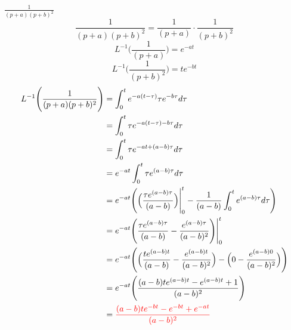 \item[4.]$\frac{1}{(p+a)(p+b)^2}$
\[
    \frac{1}{(p+a)(p+b)^2} = \frac{1}{(p+a)}\cdot\frac{1}{(p+b)^2}
\]
\begin{equation*}
    L^{-1}\Bigg(\frac{1}{(p+a)}\Bigg) 
    = e^{-at}
    \tag{By \( L2 \)}
\end{equation*}
\begin{equation*}
    L^{-1}\Bigg(\frac{1}{(p+b)^2}\Bigg) 
    = te^{-bt}
    \tag{By \( L6 \)}
\end{equation*}
\begin{align*}
    L^{-1}\Bigg( \frac{1}{(p+a)(p+b)^2} \Bigg)
    & = \int_0^t e^{-a(t-\tau)} \tau e^{-b\tau}d\tau \\
    & = \int_0^t \tau e^{-a(t-\tau)-b\tau}d\tau \\
    & = \int_0^t \tau e^{-at+(a-b)\tau}d\tau \\
    & = e^{-at}\int_0^t \tau e^{(a-b)\tau}d\tau \\
    & = e^{-at}\Bigg(\Big(\frac{\tau e^{(a-b)\tau}}{(a-b)}
    \Big)\Bigg|_0^t-\frac{1}{(a-b)} \int_0^t e^{(a-b)\tau}d\tau \Bigg)\\
    & = e^{-at}\Bigg(\frac{\tau e^{(a-b)\tau}}{(a-b)}
    -\frac{e^{(a-b)\tau}}{(a-b)^2}   \Bigg)\Bigg|_0^t\\
    & = e^{-at}\Bigg(
    \Big(\frac{t e^{(a-b)t}}{(a-b)}
    -\frac{e^{(a-b)t}}{(a-b)^2}\Big)
    -\Big(0
    -\frac{e^{(a-b)0}}{(a-b)^2}\Big)
    \Bigg)\\
    & = e^{-at}\Bigg(
    \frac{(a-b)t e^{(a-b)t}-e^{(a-b)t}+1}{(a-b)^2}
    \Bigg)\\
    & = \textcolor{red}{\frac{(a-b)t e^{-bt}-e^{-bt}+e^{-at}}{(a-b)^2}}\\
\end{align*}